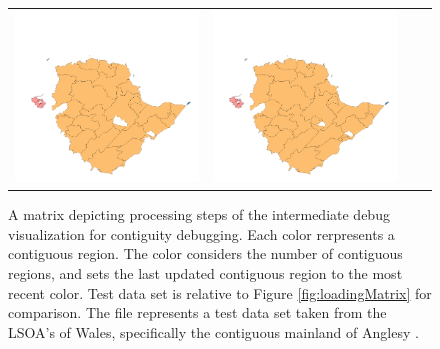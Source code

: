 \begin{figure}
\begin{tabularx}{1\textwidth}{XXXX}
\includegraphics[width=1\linewidth]{images/ch6/contig/19}&
\includegraphics[width=1\linewidth]{images/ch6/contig/20} \\
\end{tabularx}
\caption{A matrix depicting processing steps of the intermediate debug visualization for contiguity debugging. Each color rerpresents a contiguous region. The color considers the number of contiguous regions, and sets the last updated contiguous region to the most recent color. Test data set is relative to Figure \ref{fig:loadingMatrix} for comparison. The file represents a test data set taken from the LSOA's of Wales, specifically the contiguous mainland of Anglesy \cite{wales}.} \label{fig:contigMatrix}
\end{figure}

